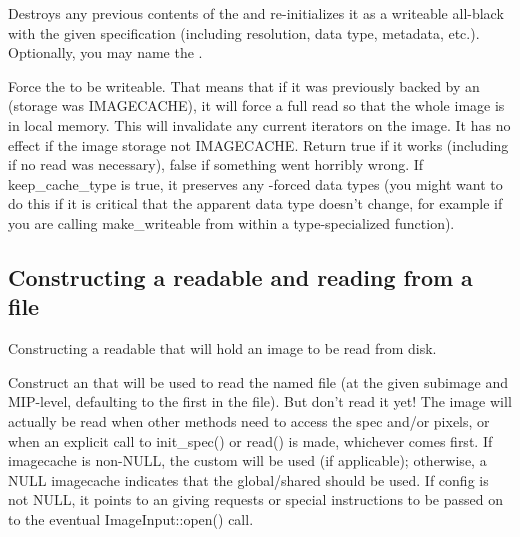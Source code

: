 Destroys any previous contents of the \ImageBuf and re-initializes it
as a writeable all-black \ImageBuf with the given specification (including
resolution, data type, metadata, etc.).  Optionally, you may name the
\ImageBuf.
\apiend

Force the \ImageBuf to be writeable. That means that if it was previously
backed by an \ImageCache (storage was {\cf IMAGECACHE}), it will force a
full read so that the whole image is in local memory.
This will invalidate any current iterators on the image. It has
no effect if the image storage not {\cf IMAGECACHE}.  Return {\cf true} if
it works (including if no read was necessary), {\cf false} if something went
horribly wrong. If {\cf keep_cache_type} is true, it preserves any
\ImageCache-forced data types (you might want to do this if it is critical
that the apparent data type doesn't change, for example if you are calling
make_writeable from within a type-specialized function).
\apiend

\subsection*{Constructing a readable \ImageBuf and reading from a file}

Constructing a readable \ImageBuf that will hold an image to be read
from disk.

Construct an \ImageBuf that will be used to read the named file (at the
given subimage and MIP-level, defaulting to the first in the file).  But
don't read it yet!  The image will actually be read when other methods
need to access the spec and/or pixels, or when an explicit call to
{\cf init_spec()} or {\cf read()} is made, whichever comes first. 
If {\cf imagecache} is non-NULL, the custom
\ImageCache will be used (if applicable); otherwise, a NULL imagecache
indicates that the global/shared \ImageCache should be used.
If {\cf config} is not NULL, it points to an \ImageSpec giving requests
or special instructions to be passed on to the eventual
{\cf ImageInput::open()} call.
\apiend

